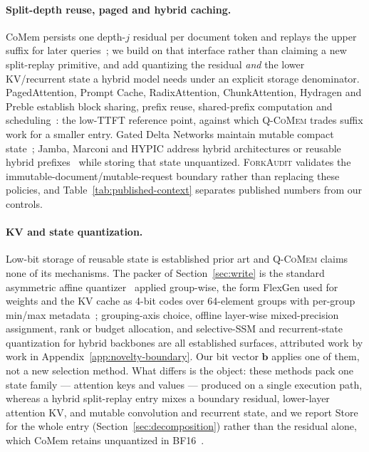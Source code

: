 \documentclass{article}
\newcommand{\qcomem}{\textsc{Q-CoMem}}
\newcommand{\method}{\textsc{ForkAudit}}
\begin{document}
\paragraph{Split-depth reuse, paged and hybrid caching.}
CoMem persists one depth-$j$ residual per document token and replays the upper
suffix for later queries~\citep{liu2026comem,liu2026understanding}; we build on
that interface rather than claiming a new split-replay primitive, and add
quantizing the residual \emph{and} the lower KV/recurrent state a hybrid model
needs under an explicit storage denominator.  PagedAttention, Prompt Cache,
RadixAttention, ChunkAttention, Hydragen and Preble establish block sharing,
prefix reuse, shared-prefix computation and
scheduling~\citep{kwon2023pagedattention,gim2024promptcache,zheng2024sglang,
ye2024chunkattention,juravsky2024hydragen,srivatsa2025preble}: the low-TTFT
reference point, against which \qcomem{} trades suffix work for a smaller entry.
Gated Delta Networks maintain mutable compact
state~\citep{yang2025gateddeltanet}; Jamba, Marconi and HYPIC address hybrid
architectures or reusable hybrid
prefixes~\citep{lieber2025jamba,pan2025marconi,liu2026hypic} while storing that
state unquantized.  \method{} validates the immutable-document/mutable-request
boundary rather than replacing these policies, and
Table~\ref{tab:published-context} separates published numbers from our
controls.

\paragraph{KV and state quantization.}
Low-bit storage of reusable state is established prior art and \qcomem{} claims
none of its mechanisms.  The packer of Section~\ref{sec:write} is the standard
asymmetric affine quantizer~\citep{jacob2018quantization} applied group-wise, the
form FlexGen used for weights and the KV cache as 4-bit codes over 64-element
groups with per-group min/max metadata~\citep{sheng2023flexgen}; grouping-axis
choice, offline layer-wise mixed-precision assignment, rank or budget
allocation, and selective-SSM and recurrent-state quantization for hybrid
backbones are all established surfaces, attributed work by work in
Appendix~\ref{app:novelty-boundary}. Our bit vector $\mathbf b$ applies one of
them, not a new selection method.  What differs is the object: these methods pack one state family ---
attention keys and values --- produced on a single execution path, whereas a
hybrid split-replay entry mixes a boundary residual, lower-layer attention KV,
and mutable convolution and recurrent state, and we report Store for the whole
entry (Section~\ref{sec:decomposition}) rather than the residual alone, which
CoMem retains unquantized in BF16~\citep{liu2026comem}.
\end{document}
